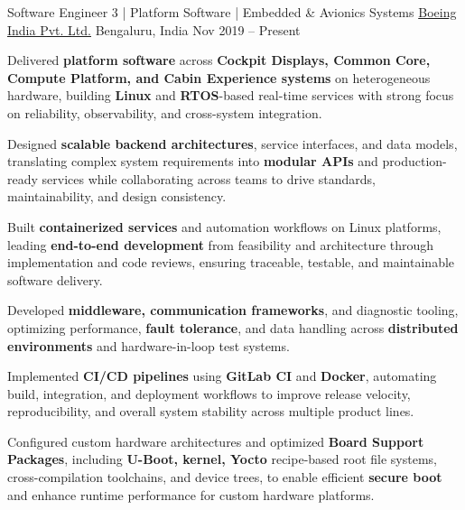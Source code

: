 \begin{cventries}
	\cventry
	{Software Engineer 3 | Platform Software | Embedded \& Avionics Systems}
	{\href{https://www.boeing.co.in/}{Boeing India Pvt. Ltd.}}
	{Bengaluru, India}
	{Nov 2019 -- Present}
	{
		\begin{cvitems}
		\item{Delivered \textbf{platform software} across \textbf{Cockpit Displays, Common Core, Compute Platform, and Cabin Experience systems} on heterogeneous hardware, building \textbf{Linux} and \textbf{RTOS}-based real-time services with strong focus on reliability, observability, and cross-system integration.}
		\vspace{3pt}
		\item{Designed \textbf{scalable backend architectures}, service interfaces, and data models, translating complex system requirements into \textbf{modular APIs} and production-ready services while collaborating across teams to drive standards, maintainability, and design consistency.}
		\vspace{3pt}
		\item{Built \textbf{containerized services} and automation workflows on Linux platforms, leading \textbf{end-to-end development} from feasibility and architecture through implementation and code reviews, ensuring traceable, testable, and maintainable software delivery.}
		\vspace{3pt}
		\item{Developed \textbf{middleware, communication frameworks}, and diagnostic tooling, optimizing performance, \textbf{fault tolerance}, and data handling across \textbf{distributed environments} and hardware-in-loop test systems.}
		\vspace{3pt}
		\item{Implemented \textbf{CI/CD pipelines} using \textbf{GitLab CI} and \textbf{Docker}, automating build, integration, and deployment workflows to improve release velocity, reproducibility, and overall system stability across multiple product lines.}
		\vspace{3pt}
		\item{Configured custom hardware architectures and optimized \textbf{Board Support Packages}, including \textbf{U-Boot, kernel, Yocto} recipe-based root file systems, cross-compilation toolchains, and device trees, to enable efficient \textbf{secure boot} and enhance runtime performance for custom hardware platforms.}
		\end{cvitems}
	}


\end{cventries}
